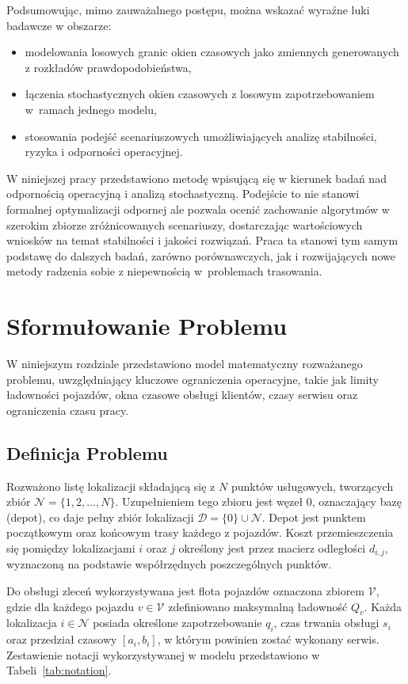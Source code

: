 Podsumowując, mimo zauważalnego postępu, można wskazać wyraźne luki badawcze w obszarze:
\begin{itemize}
    \item modelowania losowych granic okien czasowych jako zmiennych generowanych z rozkładów prawdopodobieństwa,
    \item łączenia stochastycznych okien czasowych z losowym zapotrzebowaniem w~ramach jednego modelu,
    \item stosowania podejść scenariuszowych umożliwiających analizę stabilności, ryzyka i odporności operacyjnej.
\end{itemize}

W niniejszej pracy przedstawiono metodę wpisującą się w kierunek badań nad odpornością operacyjną i analizą stochastyczną. Podejście to nie stanowi formalnej optymalizacji odpornej ale pozwala ocenić zachowanie algorytmów w szerokim zbiorze zróżnicowanych scenariuszy, dostarczając wartościowych wniosków na temat stabilności i jakości rozwiązań. Praca ta stanowi tym samym podstawę do dalszych badań, zarówno porównawczych, jak i rozwijających nowe metody radzenia sobie z niepewnością w~problemach trasowania.



\section{Sformułowanie Problemu}

W niniejszym rozdziale przedstawiono model matematyczny rozważanego problemu, uwzględniający kluczowe ograniczenia operacyjne, takie jak limity ładowności pojazdów, okna czasowe obsługi klientów, czasy serwisu oraz ograniczenia czasu pracy.

\subsection{Definicja Problemu}

Rozważono listę lokalizacji składającą się z $N$ punktów usługowych, tworzących zbiór $\mathcal{N} = \{1, 2, \dots, N\}$. Uzupełnieniem tego zbioru jest węzeł 0, oznaczający bazę (depot), co daje pełny zbiór lokalizacji $\mathcal{D} = \{0\} \cup \mathcal{N}$. Depot jest punktem początkowym oraz końcowym trasy każdego z pojazdów. Koszt przemieszczenia się pomiędzy lokalizacjami $i$ oraz $j$ określony jest przez macierz odległości $d_{i,j}$, wyznaczoną na podstawie współrzędnych poszczególnych punktów.

Do obsługi zleceń wykorzystywana jest flota pojazdów oznaczona zbiorem $\mathcal{V}$, gdzie dla każdego pojazdu $v \in \mathcal{V}$ zdefiniowano maksymalną ładowność $Q_v$. Każda lokalizacja $i \in \mathcal{N}$ posiada określone zapotrzebowanie $q_i$, czas trwania obsługi $s_i$ oraz przedział czasowy $[a_i, b_i]$, w którym powinien zostać wykonany serwis. 
Zestawienie notacji wykorzystywanej w modelu przedstawiono w Tabeli~\ref{tab:notation}.

